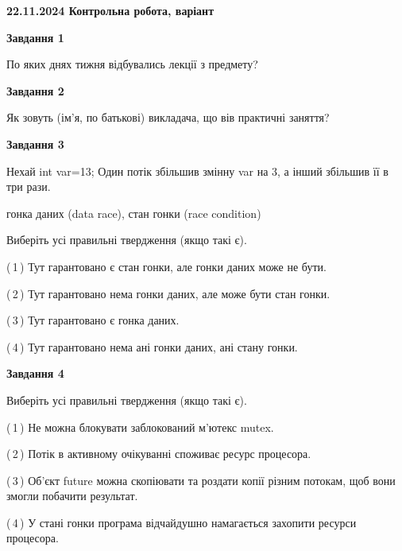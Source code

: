 \documentclass[12pt, ukrainian]{article}
\begin{document}
\begin {large}

\textbf{22.11.2024 Контрольна робота, варіант  }\par


{

\begin{center}
\textbf{Завдання 1}
\end{center}

По яких днях тижня відбувались лекції з предмету?


\begin{center}
\textbf{Завдання 2}
\end{center}

Як зовуть (ім'я, по батькові) викладача, що вів практичні заняття?


\begin{center}
\textbf{Завдання 3}
\end{center}

Нехай int var=13; Один потік збільшив змінну var на 3, а інший збільшив її в три рази.

гонка даних (data race), стан гонки (race condition)

Виберіть усі правильні твердження (якщо такі є).\par
\vspace{2mm}
(\,1\,) Тут гарантовано є стан гонки, але гонки даних може не бути.%

(\,2\,) Тут гарантовано нема гонки даних, але може бути стан гонки.%

(\,3\,) Тут гарантовано є гонка даних.%

(\,4\,) Тут гарантовано нема ані гонки даних, ані стану гонки.%


\begin{center}
\textbf{Завдання 4}
\end{center}

Виберіть усі правильні твердження (якщо такі є).\par
\vspace{2mm}

(\,1\,) Не можна блокувати заблокований м’ютекс mutex.%

(\,2\,) Потік в активному очікуванні споживає ресурс процесора.%

(\,3\,) Об’єкт future можна скопіювати та роздати копії різним потокам, щоб вони змогли побачити результат.%

(\,4\,) У стані гонки програма відчайдушно намагається захопити ресурси процесора.%


}
\end{large}
\end{document}
